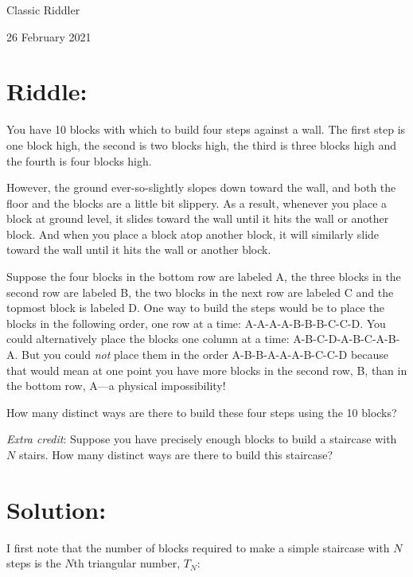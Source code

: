 \documentclass{article}
\begin{document}
\pagestyle{empty} %

\begin{center}
{\LARGE Classic Riddler}

\vspace{0.15in}

{\Large 26 February 2021}
\end{center}


\section*{Riddle:}

You have 10 blocks with which to build four steps against a wall.
The first step is one block high, the second is two blocks high, the third is three blocks high and the fourth is four blocks high.

However, the ground ever-so-slightly slopes down toward the wall, and both the floor and the blocks are a little bit slippery.
As a result, whenever you place a block at ground level, it slides toward the wall until it hits the wall or another block.
And when you place a block atop another block, it will similarly slide toward the wall until it hits the wall or another block.

Suppose the four blocks in the bottom row are labeled A, the three blocks in the second row are labeled B, the two blocks in the next row are labeled C and the topmost block is labeled D.
One way to build the steps would be to place the blocks in the following order, one row at a time: A-A-A-A-B-B-B-C-C-D.
You could alternatively place the blocks one column at a time: A-B-C-D-A-B-C-A-B-A.
But you could \textit{not} place them in the order A-B-B-A-A-A-B-C-C-D because that would mean at one point you have more blocks in the second row, B, than in the bottom row, A---a physical impossibility!

How many distinct ways are there to build these four steps using the 10 blocks?

\textit{Extra credit}: Suppose you have precisely enough blocks to build a staircase with $N$ stairs.
How many distinct ways are there to build this staircase?

\section*{Solution:}

I first note that the number of blocks required to make a simple staircase with $N$ steps is the $N$th triangular number, $T_{N}$:
\end{document}
